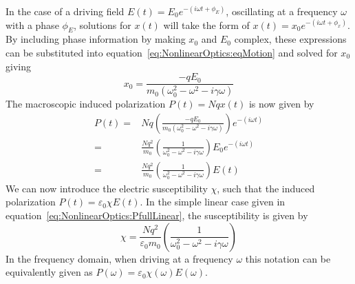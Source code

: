 In the case of a driving field $E(t) = E_0 e^{-(i\omega t + \phi_E)}$, oscillating at a frequency $\omega$ with a phase $\phi_E$, solutions for $x(t)$ will take the form of $x(t) = x_0 e^{-(i\omega t + \phi_x)}$. By including phase information by making $x_0$ and $E_0$ complex, these expressions can be substituted into equation~\ref{eq:NonlinearOptics:eqMotion} and solved for $x_0$ giving
\begin{equation}\label{eq:NonlinearOptics:x0}
	x_0 = \frac{-q E_0}{m_0 (\omega_{0}^2 -\omega^2 -i \gamma \omega)}
\end{equation}
The macroscopic induced polarization $P(t) = N q x(t)$ is now given by
\begin{equation}\label{eq:NonlinearOptics:PfullLinear}
	\begin{split}
		P(t) = & N q \left( \frac{-q E_0}{m_0 (\omega_{0}^2 -\omega^2 -i \gamma \omega)} \right) e^{-(i\omega t)} \\
		= & \frac{N q^2}{m_0} \left( \frac{1}{\omega_{0}^2 -\omega^2 -i \gamma \omega} \right) E_0 e^{-(i\omega t)} \\
		= & \frac{N q^2}{m_0} \left( \frac{1}{\omega_{0}^2 -\omega^2 -i \gamma \omega} \right) E(t)
	\end{split}
\end{equation}
We can now introduce the electric susceptibility $\chi$, such that the induced polarization $P(t) = \varepsilon_0 \chi E(t)$. In the simple linear case given in equation~\ref{eq:NonlinearOptics:PfullLinear}, the susceptibility is given by
\begin{equation}\label{eq:NonlinearOptics:PfullLinear}
		\chi = \frac{N q^2}{\varepsilon_0 m_0} \left( \frac{1}{\omega_{0}^2 -\omega^2 -i \gamma \omega} \right)
\end{equation}
In the frequency domain, when driving at a frequency $\omega$ this notation can be equivalently given as $P(\omega) = \varepsilon_0 \chi(\omega) E(\omega)$.

